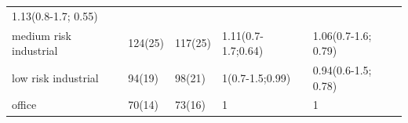 \begin{longtable}[]{@{}lllll@{}}
\begin{minipage}[t]{0.23\columnwidth}
1.13(0.8-1.7; 0.55)\strut
\end{minipage}\tabularnewline
\begin{minipage}[t]{0.20\columnwidth}\raggedright
medium risk industrial\strut
\end{minipage} & \begin{minipage}[t]{0.08\columnwidth}\raggedright
124(25)\strut
\end{minipage} & \begin{minipage}[t]{0.10\columnwidth}\raggedright
117(25)\strut
\end{minipage} & \begin{minipage}[t]{0.24\columnwidth}\raggedright
1.11(0.7-1.7;0.64)\strut
\end{minipage} & \begin{minipage}[t]{0.23\columnwidth}\raggedright
1.06(0.7-1.6; 0.79)\strut
\end{minipage}\tabularnewline
\begin{minipage}[t]{0.20\columnwidth}\raggedright
low risk industrial\strut
\end{minipage} & \begin{minipage}[t]{0.08\columnwidth}\raggedright
94(19)\strut
\end{minipage} & \begin{minipage}[t]{0.10\columnwidth}\raggedright
98(21)\strut
\end{minipage} & \begin{minipage}[t]{0.24\columnwidth}\raggedright
1(0.7-1.5;0.99)\strut
\end{minipage} & \begin{minipage}[t]{0.23\columnwidth}\raggedright
0.94(0.6-1.5; 0.78)\strut
\end{minipage}\tabularnewline
\begin{minipage}[t]{0.20\columnwidth}\raggedright
office\strut
\end{minipage} & \begin{minipage}[t]{0.08\columnwidth}\raggedright
70(14)\strut
\end{minipage} & \begin{minipage}[t]{0.10\columnwidth}\raggedright
73(16)\strut
\end{minipage} & \begin{minipage}[t]{0.24\columnwidth}\raggedright
1\strut
\end{minipage} & \begin{minipage}[t]{0.23\columnwidth}\raggedright
1\strut
\end{minipage}\tabularnewline
\bottomrule
\end{longtable}

